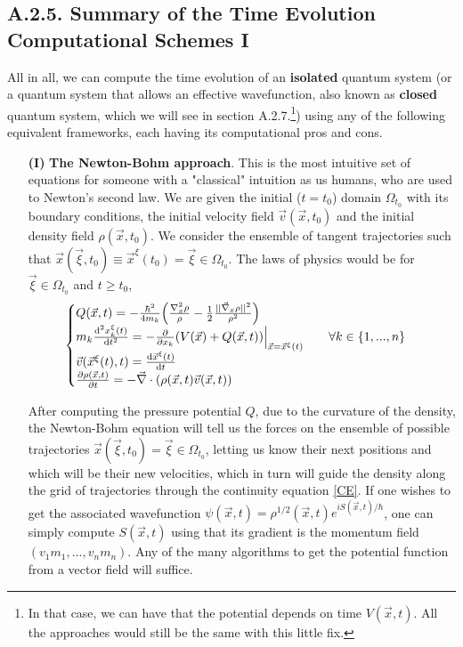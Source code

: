 \documentclass[11pt, a4paper]{article} %
\begin{document}
\subsection*{A.2.5. Summary of the Time Evolution Computational Schemes I}
All in all, we can compute the time evolution of an {\bf isolated} quantum system (or a quantum system that allows an effective wavefunction, also known as {\bf closed} quantum system, which we will see in section A.2.7.\footnote{In that case, we can have that the potential depends on time $V(\vec{x},t)$. All the approaches would still be the same with this little fix.}) using any of the following equivalent frameworks, each having its computational pros and cons.
\begin{itemize}
\item[{\bf (I)}] {\bf The Newton-Bohm approach}. This is the most intuitive set of equations for someone with a "classical" intuition as us humans, who are used to Newton's second law. We are given the initial ($t=t_0$) domain $\Omega_{t_0}$ with its boundary conditions, the initial velocity field $\vec{v}(\vec{x},t_0)$ and the initial density field $\rho(\vec{x},t_0)$. We consider the ensemble of tangent trajectories such that $\vec{x}(\vec{\xi},t_0)\equiv\vec{x}^\xi(t_0)=\vec{\xi}\in\Omega_{t_0}$. The laws of physics would be for $\vec{\xi}\in\Omega_{t_0}$ and $t\geq t_0$,
\begin{equation}
\begin{cases}
Q(\vec{x},t) = -\frac{\hbar^2}{4m_k }\qty(\frac{\nabla_x^2\rho}{\rho} -\frac{1}{2}\frac{\qty||\vec{\nabla}_x \rho||^2}{\rho^2}) \\
m_k\dv[2]{x_k^\xi(t)}{t}=-\pdv{}{x_k} \qty(V(\vec{x}) + Q(\vec{x},t))\Big\rvert_{\vec{x}=\vec{x}^\xi(t)}\quad \quad \forall k\in\{1,...,n\}\\
\vec{v}(\vec{x}^\xi(t),t)=\dv{\vec{x}^\xi(t)}{t} \\
\pdv{\rho(\vec{x},t)}{t}=-\vec{\nabla}\cdot \qty(\rho(\vec{x},t)\vec{v}(\vec{x},t))
\end{cases}
\end{equation}

After computing the pressure potential $Q$, due to the curvature of the density, the Newton-Bohm equation will tell us the forces on the ensemble of possible trajectories $\vec{x}(\vec{\xi},t_0)=\vec{\xi}\in\Omega_{t_0}$, letting us know their next positions and which will be their new velocities, which in turn will guide the density along the grid of trajectories through the continuity equation \eqref{CE}. If one wishes to get the associated wavefunction $\psi(\vec{x},t)=\rho^{1/2}(\vec{x},t)e^{iS(\vec{x},t)/\hbar}$, one can simply compute $S(\vec{x},t)$ using that its gradient is the momentum field $(v_1m_1,...,v_nm_n)$. Any of the many algorithms to get the potential function from a vector field will suffice.


\end{itemize}
\end{document}
